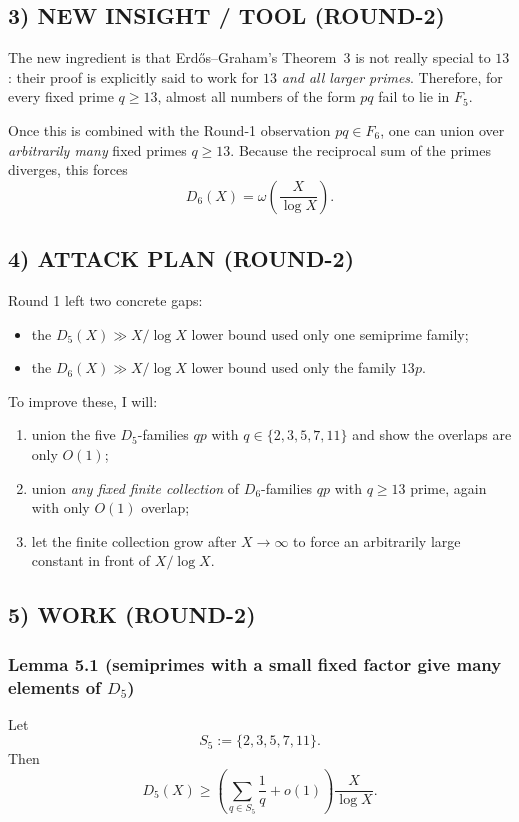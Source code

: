 \subsection*{3) NEW INSIGHT / TOOL (ROUND-2)}
The new ingredient is that Erd\H{o}s--Graham's Theorem~3 is not really special to $13$:
their proof is explicitly said to work for $13$ \emph{and all larger primes}.
Therefore, for every fixed prime $q\ge 13$, almost all numbers of the form $pq$ fail to lie in $F_5$.

Once this is combined with the Round-1 observation $pq\in F_6$, one can union over \emph{arbitrarily many} fixed primes $q\ge 13$.
Because the reciprocal sum of the primes diverges, this forces
\[
D_6(X)=\omega\!\left(\frac{X}{\log X}\right).
\]

\subsection*{4) ATTACK PLAN (ROUND-2)}
Round 1 left two concrete gaps:
\begin{itemize}
\item the $D_5(X)\gg X/\log X$ lower bound used only one semiprime family;
\item the $D_6(X)\gg X/\log X$ lower bound used only the family $13p$.
\end{itemize}

To improve these, I will:
\begin{enumerate}
\item union the five $D_5$-families $qp$ with $q\in\{2,3,5,7,11\}$ and show the overlaps are only $O(1)$;
\item union \emph{any fixed finite collection} of $D_6$-families $qp$ with $q\ge 13$ prime, again with only $O(1)$ overlap;
\item let the finite collection grow after $X\to\infty$ to force an arbitrarily large constant in front of $X/\log X$.
\end{enumerate}

\subsection*{5) WORK (ROUND-2)}

\subsubsection*{Lemma 5.1 (semiprimes with a small fixed factor give many elements of $D_5$)}
Let
\[
S_5:=\{2,3,5,7,11\}.
\]
Then
\[
D_5(X)\ge \left(\sum_{q\in S_5}\frac1q+o(1)\right)\frac{X}{\log X}.
\]

